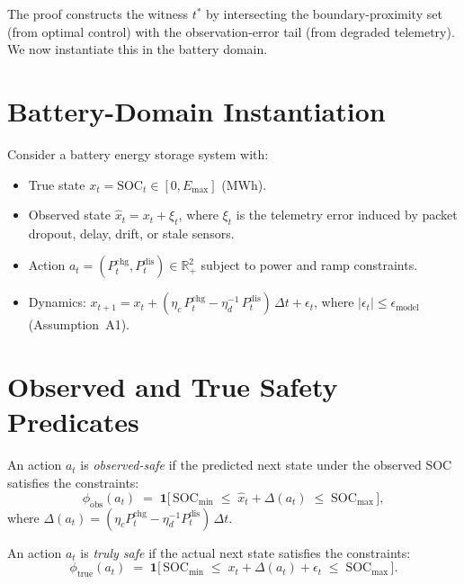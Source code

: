 The proof constructs the witness $t^*$ by intersecting the boundary-proximity
set (from optimal control) with the observation-error tail (from degraded
telemetry).  We now instantiate this in the battery domain.

\section{Battery-Domain Instantiation}
\label{sec:battery-setup}

Consider a battery energy storage system with:
\begin{itemize}
  \item True state $x_t = \text{SOC}_t \in [0, E_{\max}]$ (MWh).
  \item Observed state $\hat{x}_t = x_t + \xi_t$, where $\xi_t$ is
    the telemetry error induced by packet dropout, delay, drift, or
    stale sensors.
  \item Action $a_t = (P_t^{\text{chg}}, P_t^{\text{dis}}) \in \mathbb{R}_+^2$
    subject to power and ramp constraints.
  \item Dynamics: $x_{t+1} = x_t + (\eta_c\,P_t^{\text{chg}} -
    \eta_d^{-1}\,P_t^{\text{dis}})\,\Delta t + \epsilon_t$, where
    $|\epsilon_t| \le \epsilon_{\text{model}}$ (Assumption~A1).
\end{itemize}

\section{Observed and True Safety Predicates}

\begin{definition}
\label{def:obs-safe}
An action $a_t$ is \emph{observed-safe} if the predicted next state
under the observed SOC satisfies the constraints:
\[
  \phi_{\text{obs}}(a_t) \;=\; \mathbf{1}\!\bigl[\,
    \text{SOC}_{\min} \;\le\; \hat{x}_t + \Delta(a_t) \;\le\;
    \text{SOC}_{\max}\,\bigr],
\]
where $\Delta(a_t) = (\eta_c P_t^{\text{chg}} -
\eta_d^{-1} P_t^{\text{dis}})\,\Delta t$.
\end{definition}

\begin{definition}
\label{def:true-safe}
An action $a_t$ is \emph{truly safe} if the actual next state satisfies
the constraints:
\[
  \phi_{\text{true}}(a_t) \;=\; \mathbf{1}\!\bigl[\,
    \text{SOC}_{\min} \;\le\; x_t + \Delta(a_t) + \epsilon_t \;\le\;
    \text{SOC}_{\max}\,\bigr].
\]
\end{definition}

